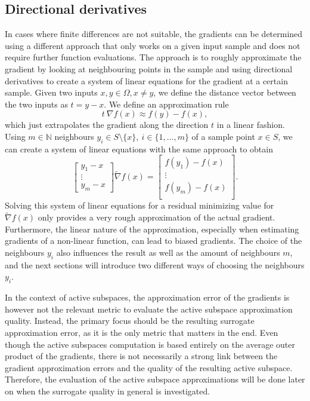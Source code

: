 \documentclass[
  a4paper,  %
  twoside,  %
  bibliography=totoc,
  headsepline,
  cleardoublepage=empty,
  parskip=half,
  draft=false
]{scrbook}
\begin{document}
\subsection{Directional derivatives}

In cases where finite differences are not suitable, the gradients can be determined using a different approach that only works on a given input sample and does not require further function evaluations.
The approach is to roughly approximate the gradient by looking at neighbouring points in the sample and using directional derivatives to create a system of linear equations for the gradient at a certain sample.
Given two inputs $x, y \in \Omega, x \neq y$, we define the distance vector between the two inputs as $t=y-x$.
We define an approximation rule
\begin{equation}
t ~ \nabla f(x) \approx f(y) - f(x),
\end{equation}
which just extrapolates the gradient along the direction $t$ in a linear fashion.
Using $m \in \mathds{N}$ neighbours $y_i \in S \setminus \{x\}, ~ i \in \{1, \dots, m\}$ of a sample point $x \in S$, we can create a system of linear equations with the same approach to obtain
\begin{equation}
\begin{bmatrix}
    y_1 - x\\
    \vdots \\
    y_m - x
  \end{bmatrix}  \widetilde{\nabla} f(x) =\begin{bmatrix}
    f(y_1) - f(x) \\ \vdots \\  f(y_m) - f(x)
    \\
  \end{bmatrix}.
  \label{eq:dd_sle}
\end{equation}
Solving this system of linear equations for a residual minimizing value for $\widetilde{\nabla} f(x)$ only provides a very rough approximation of the actual gradient.
Furthermore, the linear nature of the approximation, especially when estimating gradients of a non-linear function, can lead to biased gradients.
The choice of the neighbours $y_i$ also influences the result as well as the amount of neighbours $m$, and the next sections will introduce two different ways of choosing the neighbours $y_i$.

In the context of active subspaces, the approximation error of the gradients is however not the relevant metric to evaluate the active subspace approximation quality.
Instead, the primary focus should be the resulting surrogate approximation error, as it is the only metric that matters in the end.
Even though the active subspaces computation is based entirely on the average outer product of the gradients, there is not necessarily a strong link between the gradient approximation errors and the quality of the resulting active subspace.
Therefore, the evaluation of the active subspace approximations will be done later on when the surrogate quality in general is investigated.
\end{document}
